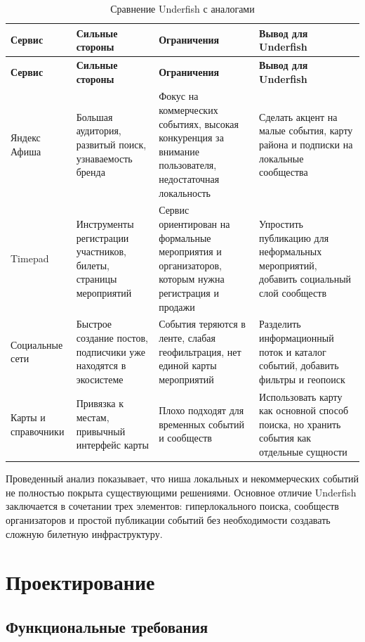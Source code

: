 \begin{longtable}{|p{3.2cm}|p{4.2cm}|p{4.2cm}|p{3.2cm}|}
\caption{Сравнение Underfish с аналогами}\label{tab:analogs}\\
\hline
\textbf{Сервис} & \textbf{Сильные стороны} & \textbf{Ограничения} & \textbf{Вывод для Underfish} \\
\hline
\endfirsthead
\hline
\textbf{Сервис} & \textbf{Сильные стороны} & \textbf{Ограничения} & \textbf{Вывод для Underfish} \\
\hline
\endhead
Яндекс Афиша \cite{yandexafisha} & Большая аудитория, развитый поиск, узнаваемость бренда & Фокус на коммерческих событиях, высокая конкуренция за внимание пользователя, недостаточная локальность & Сделать акцент на малые события, карту района и подписки на локальные сообщества \\
\hline
Timepad \cite{timepad} & Инструменты регистрации участников, билеты, страницы мероприятий & Сервис ориентирован на формальные мероприятия и организаторов, которым нужна регистрация и продажи & Упростить публикацию для неформальных мероприятий, добавить социальный слой сообществ \\
\hline
Социальные сети & Быстрое создание постов, подписчики уже находятся в экосистеме & События теряются в ленте, слабая геофильтрация, нет единой карты мероприятий & Разделить информационный поток и каталог событий, добавить фильтры и геопоиск \\
\hline
Карты и справочники & Привязка к местам, привычный интерфейс карты & Плохо подходят для временных событий и сообществ & Использовать карту как основной способ поиска, но хранить события как отдельные сущности \\
\hline
\end{longtable}

Проведенный анализ показывает, что ниша локальных и некоммерческих событий не полностью покрыта существующими решениями. Основное отличие Underfish заключается в сочетании трех элементов: гиперлокального поиска, сообществ организаторов и простой публикации событий без необходимости создавать сложную билетную инфраструктуру.

\section{Проектирование}

\subsection{Функциональные требования}

